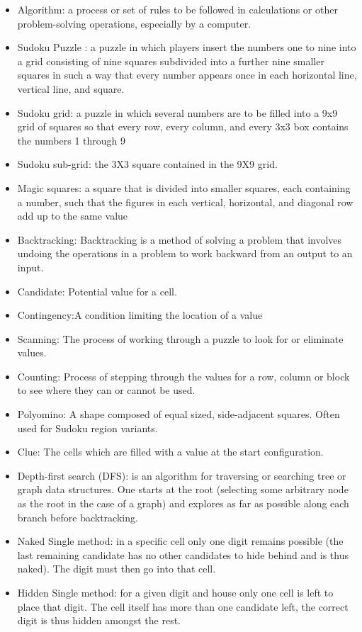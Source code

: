 \documentclass[12pt]{article}
\begin{document}
\begin{itemize}
\item Algorithm: a process or set of rules to be followed in calculations or other problem-solving operations, especially by a computer.
\item Sudoku Puzzle : a puzzle in which players insert the numbers one to nine into a grid consisting of nine squares subdivided into a further nine smaller squares in such a way that every number appears once in each horizontal line, vertical line, and square.
\item Sudoku grid:  a puzzle in which several numbers are to be filled into a 9x9 grid of squares so that every row, every column, and every 3x3 box contains the numbers 1 through 9
\item Sudoku sub-grid: the 3X3 square contained in the 9X9 grid.
\item Magic squares: a square that is divided into smaller squares, each containing a number, such that the figures in each vertical, horizontal, and diagonal row add up to the same value
\item Backtracking: Backtracking is a method of solving a problem that involves undoing the operations in a problem to work backward from an output to an input.
\item Candidate: Potential value for a cell.
\item Contingency:A condition limiting the location of a value
\item Scanning: The process of working through a puzzle to look for or eliminate values.
\item Counting: Process of stepping through the values for a row, column or block to see where they can or cannot be used.
\item Polyomino:
A shape composed of equal sized, side-adjacent squares. Often used for Sudoku region variants.
\item Clue: The cells which are filled with a value at the start configuration.
\item Depth-first search (DFS): is an algorithm for traversing or searching tree or graph data structures. One starts at the root (selecting some arbitrary node as the root in the case of a graph) and explores as far as possible along each branch before backtracking.
\item Naked Single method:  in a specific cell only one digit remains possible (the last remaining candidate has no other candidates to hide behind and is thus naked). The digit must then go into that cell.
\item Hidden Single method: for a given digit and house only one cell is left to place that digit. The cell itself has more than one candidate left, the correct digit is thus hidden amongst the rest.

\end{itemize}
\end{document}
